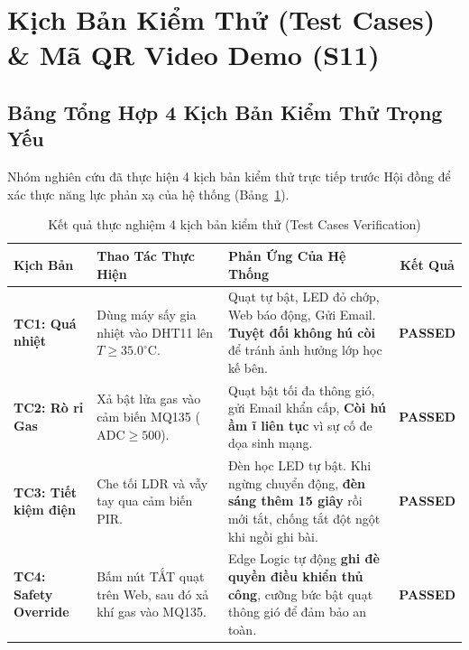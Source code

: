 \documentclass[12pt,a4paper]{article}
\begin{document}
\section{Kịch Bản Kiểm Thử (Test Cases) \& Mã QR Video Demo (S11)}

\subsection{Bảng Tổng Hợp 4 Kịch Bản Kiểm Thử Trọng Yếu}
Nhóm nghiên cứu đã thực hiện 4 kịch bản kiểm thử trực tiếp trước Hội đồng để xác thực năng lực phản xạ của hệ thống (Bảng~\ref{tab:test_cases}).

\begin{table}[htbp]
    \centering
    \caption{Kết quả thực nghiệm 4 kịch bản kiểm thử (Test Cases Verification)}
    \label{tab:test_cases}
    \begin{tabular}{@{}lp{4.2cm}p{5.5cm}c@{}}
        \toprule
        \textbf{Kịch Bản} & \textbf{Thao Tác Thực Hiện} & \textbf{Phản Ứng Của Hệ Thống} & \textbf{Kết Quả} \\
        \midrule
        \textbf{TC1: Quá nhiệt} & Dùng máy sấy gia nhiệt vào DHT11 lên $T \ge 35.0^\circ\text{C}$. & Quạt tự bật, LED đỏ chớp, Web báo động, Gửi Email. \textbf{Tuyệt đối không hú còi} để tránh ảnh hưởng lớp học kế bên. & \textbf{PASSED} \\
        \addlinespace
        \textbf{TC2: Rò rỉ Gas} & Xả bật lửa gas vào cảm biến MQ135 ($\text{ADC} \ge 500$). & Quạt bật tối đa thông gió, gửi Email khẩn cấp, \textbf{Còi hú ầm ĩ liên tục} vì sự cố đe dọa sinh mạng. & \textbf{PASSED} \\
        \addlinespace
        \textbf{TC3: Tiết kiệm điện} & Che tối LDR và vẫy tay qua cảm biến PIR. & Đèn học LED tự bật. Khi ngừng chuyển động, \textbf{đèn sáng thêm 15 giây} rồi mới tắt, chống tắt đột ngột khi ngồi ghi bài. & \textbf{PASSED} \\
        \addlinespace
        \textbf{TC4: Safety Override} & Bấm nút TẮT quạt trên Web, sau đó xả khí gas vào MQ135. & Edge Logic tự động \textbf{ghi đè quyền điều khiển thủ công}, cưỡng bức bật quạt thông gió để đảm bảo an toàn. & \textbf{PASSED} \\
        \bottomrule
    \end{tabular}
\end{table}
\end{document}
